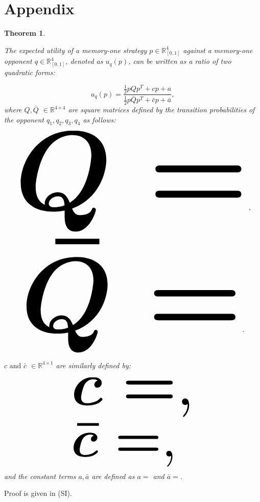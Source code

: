 \documentclass[9pt,twocolumn,twoside,lineno]{pnas-new}
\newcommand{\R}{\mathbb{R}}
\newtheorem{theorem}{Theorem}
\begin{document}
\section*{Appendix}

\begin{theorem}\label{theorem_one}

    The expected utility of a memory-one strategy \(p\in\mathbb{R}_{[0,1]}^4\)
    against a memory-one opponent \(q\in\mathbb{R}_{[0,1]}^4\), denoted
    as \(u_q(p)\), can be written as a ratio of two quadratic forms:

    \begin{equation}\label{eq:optimisation_quadratic}
    u_q(p) = \frac{\frac{1}{2}pQp^T + cp + a}
                {\frac{1}{2}p\bar{Q}p^T + \bar{c}p + \bar{a}},
    \end{equation}
    where \(Q, \bar{Q}\) \(\in \R^{4\times4}\) are square matrices defined by the
    transition probabilities of the opponent \(q_1, q_2, q_3, q_4\) as follows:

    \begin{center}
    \begin{equation}
    \resizebox{.95\linewidth}{!}{\arraycolsep=2.5pt%
    \boldmath\(
    Q = \)},
    \end{equation}
    \begin{equation}\label{eq:q_bar_matrix}
    \resizebox{.9\linewidth}{!}{\arraycolsep=2.5pt%
    \boldmath\(
    \bar{Q} =  \)}.
    \end{equation}
    \end{center}

    \(c \text{ and } \bar{c}\) \(\in \R^{4 \times 1}\) are similarly defined by:

    \begin{equation}\label{eq:q_matrix_numerator}
    \resizebox{0.5\linewidth}{!}{\arraycolsep=2.5pt%
    \boldmath\(c = \),}
    \end{equation}
    \begin{equation}\label{eq:q_matrix_denominator}
    \resizebox{0.5\linewidth}{!}{\arraycolsep=2.5pt%
    \boldmath\(\bar{c} = \),
    }
    \end{equation}
    and the constant terms \(a, \bar{a}\) are defined as \(a = \) and
    \(\bar{a} = \).
\end{theorem}

Proof is given in (SI).
\end{document}
